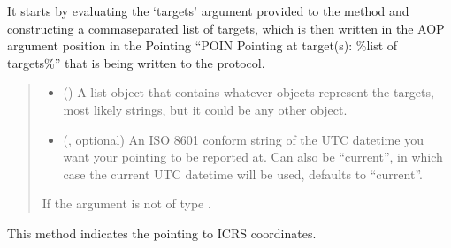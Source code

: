 \documentclass[letterpaper,10pt,english]{sphinxmanual}
\begin{document}
\begin{fulllineitems}
\begin{fulllineitems}
\sphinxAtStartPar
It starts by evaluating the ‘targets’ argument provided to the method
and constructing a comma\sphinxhyphen{}separated list of targets, which is then
written in the AOP argument position in the Pointing “POIN Pointing at
target(s): \%list of targets\%” that is being written to the protocol.
\begin{quote}\begin{description}
\begin{itemize}
\item {} 
\sphinxAtStartPar
{} () \textendash{} A list object that contains whatever objects represent the targets,
most likely strings, but it could be any other object.

\item {} 
\sphinxAtStartPar
{} (, optional) \textendash{} An ISO 8601 conform string of the UTC datetime you want your
pointing to be reported at. Can also be “current”, in which case the
current UTC datetime will be used, defaults to “current”.

\end{itemize}

\sphinxAtStartPar
{} \textendash{} If the  argument is not of type .

\end{description}\end{quote}

\end{fulllineitems}


\begin{fulllineitems}
\label{\detokenize{autoapi/aop/aop/index:aop.aop.Session.point_to_coords}}
\pysigstartsignatures
{}
\pysigstopsignatures
\sphinxAtStartPar
This method indicates the pointing to ICRS coordinates.


\end{fulllineitems}
\end{fulllineitems}
\end{document}
